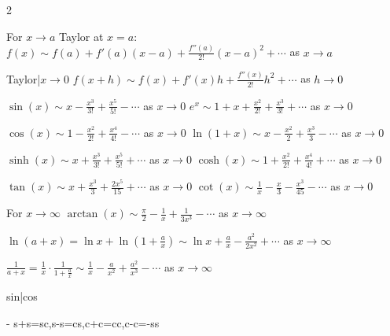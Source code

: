 \documentclass{note}
\begin{document}
\begin{multicols}{2}
{{    \vspace{-2pt}
    \begin{MyTh}{For $x\to a$}\tiny
        Taylor at $x=a$: $f(x)\sim f(a) + f'(a)(x-a) + \frac{f''(a)}{2!}(x-a)^2 + \cdots$ as $x\to a$
    \end{MyTh}

    \vspace{-2pt}
    \begin{MyTh}{Taylor|$x\to0$}
        $f(x+h)\sim f(x) + f'(x)h + \frac{f''(x)}{2!}h^2 + \cdots$ as $h\to0$

        \vspace{-2pt}
        \quad $\sin(x)\sim x - \frac{x^3}{3!} + \frac{x^5}{5!} - \cdots$ as $x\to0$ \quad $e^x \sim 1 + x + \frac{x^2}{2!} + \frac{x^3}{3!} + \cdots$ as $x\to0$

        \quad $\cos(x)\sim 1 - \frac{x^2}{2!} + \frac{x^4}{4!} - \cdots$ as $x\to0$ \quad $\ln(1+x) \sim x - \frac{x^2}{2} + \frac{x^3}{3} - \cdots$ as $x\to0$

        \quad $\sinh(x)\sim x + \frac{x^3}{3!} + \frac{x^5}{5!} + \cdots$ as $x\to0$ \quad $\cosh(x) \sim 1 + \frac{x^2}{2!} + \frac{x^4}{4!} + \cdots$ as $x\to0$
        
        \quad $\tan(x)\sim x + \frac{x^3}{3} + \frac{2x^5}{15} + \cdots$ as $x\to0$ \quad $\cot(x) \sim \frac{1}{x} - \frac{x}{3} - \frac{x^3}{45} - \cdots$ as $x\to0$
    \end{MyTh}

    \begin{MyTh}{For $x\to\infty$}
        $\arctan(x) \sim \frac{\pi}{2} - \frac{1}{x} + \frac{1}{3x^3} - \cdots$ as $x\to\infty$

        \vspace{-2pt}
        \quad $\ln(a+x) = \ln x + \ln(1+\frac{a}{x}) \sim \ln x + \frac{a}{x} - \frac{a^2}{2x^2} + \cdots$ as $x\to\infty$

        \vspace{-2pt}
        \quad $\frac{1}{a+x} = \frac{1}{x}\cdot\frac{1}{1+\frac{a}{x}} \sim \frac{1}{x} - \frac{a}{x^2} + \frac{a^2}{x^3} - \cdots$ as $x\to\infty$
        
    \end{MyTh}

    \begin{MyTh}{sin|cos}

        -  \quad s+s=sc,s-s=cs,c+c=cc,c-c=-ss
    \end{MyTh}


}}
\end{multicols}
\end{document}
